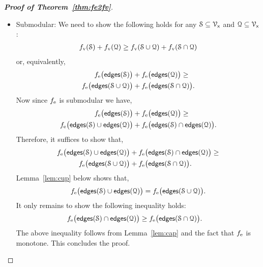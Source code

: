 \documentclass[conference]{IEEEtran}
\begin{document}
\begin{proof}[\bfseries Proof of Theorem~\ref{thm:fe2fv}]
\begin{itemize}
\item Submodular: We need to show the following holds
 for any $\mathcal{S} \subseteq \mathcal{V}_\mathsf{x}$ and $\mathcal{Q} \subseteq \mathcal{V}_\mathsf{x}$:
 \begin{align}
   f_\text{v}(\mathcal{S}) + f_\text{v}(\mathcal{Q}) \geq f_\text{v}(\mathcal{S}\cup\mathcal{Q}) + f_\text{v}(\mathcal{S}\cap\mathcal{Q})
   \label{}
 \end{align}
 or, equivalently,
 \begin{align}
   f_\text{e}\big(\mathsf{edges}(\mathcal{S})\big) & + f_\text{e}\big(\mathsf{edges}(\mathcal{Q})\big) \geq \nonumber \\
   f_\text{e}\big(\mathsf{edges}(\mathcal{S} \cup \mathcal{Q})\big) & + f_\text{e}\big(\mathsf{edges}(\mathcal{S} \cap \mathcal{Q})\big).
   \label{}
 \end{align}
 Now since $f_\text{e}$ is submodular we have,
  \begin{align}
    f_\text{e}\big(\mathsf{edges}(\mathcal{S})\big) & + f_\text{e}\big(\mathsf{edges}(\mathcal{Q})\big) \geq \nonumber \\
    f_\text{e}\big(\mathsf{edges}(\mathcal{S}) \cup \mathsf{edges}(\mathcal{Q})\big) & + f_\text{e}\big(\mathsf{edges}(\mathcal{S}) \cap \mathsf{edges}(\mathcal{Q})\big).
    \label{}
  \end{align}
  Therefore, it suffices to show that,
  \begin{align}
    f_\text{e}\big(\mathsf{edges}(\mathcal{S}) \cup \mathsf{edges}(\mathcal{Q})\big) & + f_\text{e}\big(\mathsf{edges}(\mathcal{S}) \cap
    \mathsf{edges}(\mathcal{Q})\big) \geq \nonumber \\
    f_\text{e}\big(\mathsf{edges}(\mathcal{S} \cup \mathcal{Q})\big) & + f_\text{e}\big(\mathsf{edges}(\mathcal{S} \cap \mathcal{Q})\big).
    \label{}
  \end{align}
  Lemma~\ref{lem:cup} below shows that,
   \begin{equation}
     f_\text{e}\big(\mathsf{edges}(\mathcal{S})  \cup \mathsf{edges}(\mathcal{Q})\big) =  f_\text{e}\big(\mathsf{edges}(\mathcal{S} \cup
     \mathcal{Q})\big).\label{eq:cup}
   \end{equation}
  It only remains to show the following inequality holds:
   \begin{align}
     f_\text{e}\big(\mathsf{edges}(\mathcal{S})  \cap \mathsf{edges}(\mathcal{Q})\big) &\geq  f_\text{e}\big(\mathsf{edges}(\mathcal{S} \cap
     \mathcal{Q})\big).\label{eq:cap}
   \end{align}
   The above inequality follows from Lemma~\ref{lem:cap} and the fact that
   $f_\text{e}$ is monotone. This concludes the proof.
\end{itemize}
\end{proof}
\vspace{0.5cm}
\end{document}
